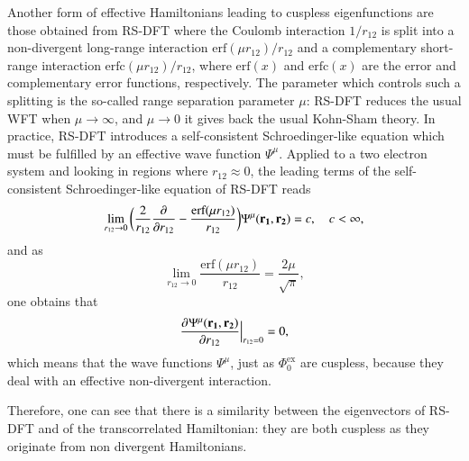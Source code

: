 \documentclass[aip,jcp,reprint,noshowkeys,superscriptaddress,twocolumn]{revtex4-1}
\newcommand{\deriv}[3]{\frac{\partial^{#3} #1}{\partial {#2}^{#3}}}
\newcommand{\bd}[1]{{\bf {#1}}}
\newcommand{\phiex}[0]{\Phi^{\text{ex}}_0}
\begin{document}
Another form of effective Hamiltonians leading to cuspless eigenfunctions are those obtained from RS-DFT 
where the Coulomb interaction $1/r_{12}$ is split into a non-divergent long-range interaction $\text{erf}(\mu r_{12})/r_{12}$ and a complementary short-range interaction $\text{erfc}(\mu r_{12})/r_{12}$, where $\text{erf}(x)$ and $\text{erfc}(x)$ are the error and complementary error functions, respectively. 
The parameter which controls such a splitting is the so-called range separation parameter $\mu$:  RS-DFT reduces the usual WFT when $\mu \rightarrow \infty$, and $\mu \rightarrow 0$ it gives back the usual Kohn-Sham theory.  
In practice, RS-DFT introduces a self-consistent Schroedinger-like equation which must be fulfilled by an effective wave function  $\Psi^\mu$.
Applied to a two electron system and looking in regions where $r_{12}\approx 0$, the leading terms of the self-consistent Schroedinger-like equation of RS-DFT reads 
\begin{equation}
 \label{eq:cusp_psi_mu_0}
 \lim_{r_{12}\rightarrow 0}\bigg( \frac{2}{r_{12}} \deriv{}{r_{12}}{} -\frac{\text{erf}(\mu r_{12})}{r_{12}}\bigg) \Psi^\mu(\bd{r_1},\bd{r_2})  = c,\quad c<\infty,  
\end{equation}
and as
\begin{equation}
 \lim_{r_{12} \rightarrow 0} \frac{\text{erf}(\mu r_{12})}{r_{12}} = \frac{2 \mu}{\sqrt{\pi}} , 
\end{equation}
one obtains that 
\begin{equation}
 \label{eq:cusp_psi_mu_1}
 \deriv{\Psi^\mu(\bd{r_1},\bd{r_2})}{r_{12}}{}\Bigr|_{r_{12}=0} = 0, 
\end{equation}
which means that the wave functions $\Psi^\mu$, just as $\phiex$ are cuspless, because they deal with an effective non-divergent interaction. 

Therefore, one can see that there is a similarity between the eigenvectors of RS-DFT and of the transcorrelated Hamiltonian: they are both cuspless as they originate from non divergent Hamiltonians. 
\end{document}
